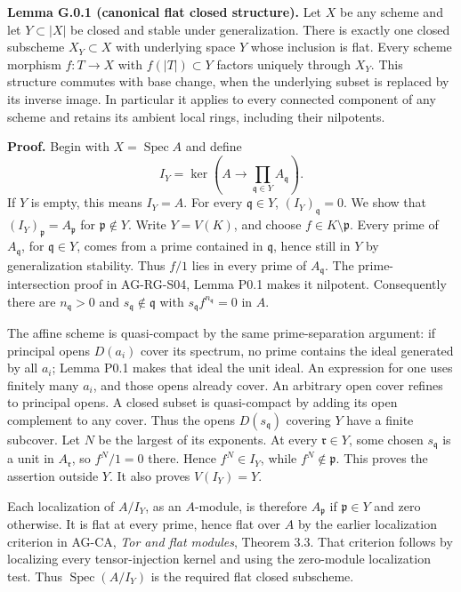 \documentclass[11pt,a4paper,openany]{report}
\begin{document}
\textbf{Lemma G.0.1 (canonical flat closed structure).} Let \(X\) be any scheme and let \(Y\subset |X|\) be closed and stable under generalization. There is exactly one closed subscheme \(X_Y\subset X\) with underlying space \(Y\) whose inclusion is flat. Every scheme morphism \(f:T\to X\) with \(f(|T|)\subset Y\) factors uniquely through \(X_Y\). This structure commutes with base change, when the underlying subset is replaced by its inverse image. In particular it applies to every connected component of any scheme and retains its ambient local rings, including their nilpotents.

\textbf{Proof.} Begin with \(X=\operatorname{Spec}A\) and define \[
 I_Y=\ker\left(A\longrightarrow\prod_{\mathfrak q\in Y}A_{\mathfrak q}\right).
\] If \(Y\) is empty, this means \(I_Y=A\). For every \(\mathfrak q\in Y\), \((I_Y)_{\mathfrak q}=0\). We show that \((I_Y)_{\mathfrak p}=A_{\mathfrak p}\) for \(\mathfrak p\notin Y\). Write \(Y=V(K)\), and choose \(f\in K\setminus\mathfrak p\). Every prime of \(A_{\mathfrak q}\), for \(\mathfrak q\in Y\), comes from a prime contained in \(\mathfrak q\), hence still in \(Y\) by generalization stability. Thus \(f/1\) lies in every prime of \(A_{\mathfrak q}\). The prime-intersection proof in AG-RG-S04, Lemma P0.1 makes it nilpotent. Consequently there are \(n_{\mathfrak q}>0\) and \(s_{\mathfrak q}\notin\mathfrak q\) with \(s_{\mathfrak q}f^{n_{\mathfrak q}}=0\) in \(A\).

The affine scheme is quasi-compact by the same prime-separation argument: if principal opens \(D(a_i)\) cover its spectrum, no prime contains the ideal generated by all \(a_i\); Lemma P0.1 makes that ideal the unit ideal. An expression for one uses finitely many \(a_i\), and those opens already cover. An arbitrary open cover refines to principal opens. A closed subset is quasi-compact by adding its open complement to any cover. Thus the opens \(D(s_{\mathfrak q})\) covering \(Y\) have a finite subcover. Let \(N\) be the largest of its exponents. At every \(\mathfrak r\in Y\), some chosen \(s_{\mathfrak q}\) is a unit in \(A_{\mathfrak r}\), so \(f^N/1=0\) there. Hence \(f^N\in I_Y\), while \(f^N\notin\mathfrak p\). This proves the assertion outside \(Y\). It also proves \(V(I_Y)=Y\).

Each localization of \(A/I_Y\), as an \(A\)-module, is therefore \(A_{\mathfrak p}\) if \(\mathfrak p\in Y\) and zero otherwise. It is flat at every prime, hence flat over \(A\) by the earlier localization criterion in AG-CA, \emph{Tor and flat modules}, Theorem 3.3. That criterion follows by localizing every tensor-injection kernel and using the zero-module localization test. Thus \(\operatorname{Spec}(A/I_Y)\) is the required flat closed subscheme.
\end{document}
